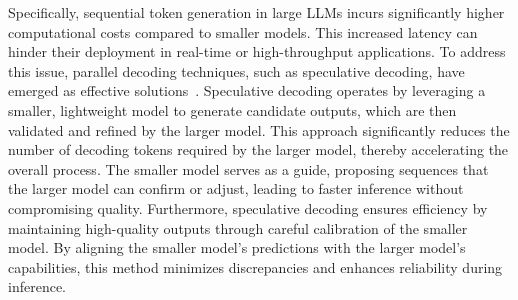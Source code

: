 \documentclass{article}
\theoremstyle{plain}
\theoremstyle{definition}
\theoremstyle{remark}
\begin{document}
Specifically, sequential token generation in large LLMs incurs significantly higher computational costs compared to smaller models. This increased latency can hinder their deployment in real-time or high-throughput applications. To address this issue, parallel decoding techniques, such as speculative decoding, have emerged as effective solutions~\cite{leviathan2023fast}.
Speculative decoding operates by leveraging a smaller, lightweight model to generate candidate outputs, which are then validated and refined by the larger model. This approach significantly reduces the number of decoding tokens required by the larger model, thereby accelerating the overall process. The smaller model serves as a guide, proposing sequences that the larger model can confirm or adjust, leading to faster inference without compromising quality.
Furthermore, speculative decoding ensures efficiency by maintaining high-quality outputs through careful calibration of the smaller model. By aligning the smaller model's predictions with the larger model's capabilities, this method minimizes discrepancies and enhances reliability during inference.
\end{document}
